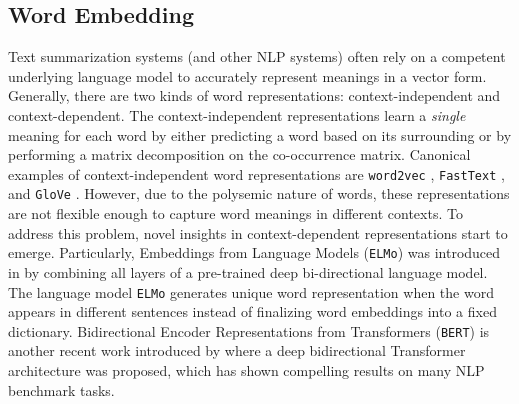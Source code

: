 \subsection{Word Embedding}

Text summarization systems (and other NLP systems) often rely on a competent underlying language model to accurately represent meanings in a vector form. Generally, there are two kinds of word representations: context-independent and context-dependent. The context-independent representations learn a \textit{single} meaning for each word by either predicting a word based on its surrounding or by performing a matrix decomposition on the co-occurrence matrix. Canonical examples of context-independent word representations are \texttt{word2vec} \cite{mikolov2013efficient}, \texttt{FastText} \cite{bojanowski2017enriching}, and \texttt{GloVe} \cite{pennington2014glove}. However, due to the polysemic nature of words, these representations are not flexible enough to capture word meanings in different contexts. To address this problem, novel insights in context-dependent representations start to emerge. Particularly, Embeddings from Language Models (\texttt{ELMo}) was introduced in \cite{peters2018deep} by combining all layers of a pre-trained deep bi-directional language model. The language model \texttt{ELMo} generates unique word representation when the word appears in different sentences instead of finalizing word embeddings into a fixed dictionary. Bidirectional Encoder Representations from Transformers (\texttt{BERT}) is another recent work introduced by \cite{devlin2018bert} where a deep bidirectional Transformer architecture was proposed, which has shown compelling results on many NLP benchmark tasks.  


